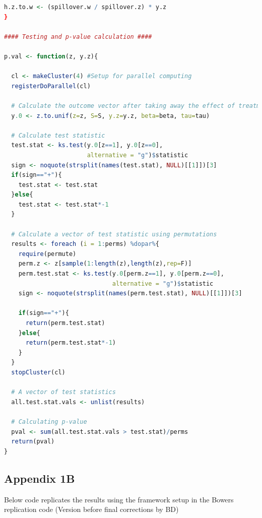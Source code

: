 \documentclass[12pt]{article}
\begin{document}
\begin{lstlisting}[language=R]
  h.z.to.w <- (spillover.w / spillover.z) * y.z
}

#### Testing and p-value calculation ####

p.val <- function(z, y.z){
  
  cl <- makeCluster(4) #Setup for parallel computing
  registerDoParallel(cl)
    
  # Calculate the outcome vector after taking away the effect of treatment
  y.0 <- z.to.unif(z=z, S=S, y.z=y.z, beta=beta, tau=tau)
  
  # Calculate test statistic
  test.stat <- ks.test(y.0[z==1], y.0[z==0],
                       alternative = "g")$statistic
  sign <- noquote(strsplit(names(test.stat), NULL)[[1]])[3]
  if(sign=="+"){
    test.stat <- test.stat
  }else{
    test.stat <- test.stat*-1
  }  
  
  # Calculate a vector of test statistic using permutations
  results <- foreach (i = 1:perms) %dopar%{
    require(permute)
    perm.z <- z[sample(1:length(z),length(z),rep=F)]
    perm.test.stat <- ks.test(y.0[perm.z==1], y.0[perm.z==0],
                              alternative = "g")$statistic
    sign <- noquote(strsplit(names(perm.test.stat), NULL)[[1]])[3]
    
    if(sign=="+"){
      return(perm.test.stat)
    }else{
      return(perm.test.stat*-1)
    }
  }
  stopCluster(cl)
  
  # A vector of test statistics
  all.test.stat.vals <- unlist(results)
  
  # Calculating p-value
  pval <- sum(all.test.stat.vals > test.stat)/perms
  return(pval)
}
\end{lstlisting}


\subsection{Appendix 1B}

Below code replicates the \citep{coppock2014information} results using the framework setup in the Bowers replication code
(Version before final corrections by BD)
\end{document}
